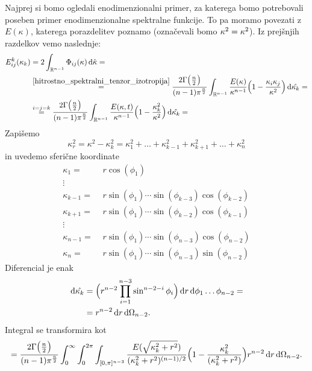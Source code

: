 \documentclass[mat2, tisk]{fmfdelo}
\newcommand{\R}{\mathbb R}
\newcommand{\bd}{\textbf}
\begin{document}
Najprej si bomo ogledali enodimenzionalni primer, za katerega bomo
potrebovali poseben primer enodimenzionalne spektralne funkcije. To pa moramo 
povezati z $E(\kappa)$, katerega porazdelitev poznamo (označevali bomo $\bd{\text{$\kappa$}}^2 = \kappa^2$). Iz prejšnjih razdelkov vemo 
naslednje: 
\begin{align*}
E_{ij}^k(\kappa_k) &= 2 \int_{\R^{n-1}}\Phi_{ij}(\bd{\text{$\kappa$}}) \dif \hat{\bd{\text{$\kappa$}}} = \\
&\stackrel{\ref{hitrostno_spektralni_tenzor_izotropija}}{=} \frac{2\Gamma\big(\frac{n}{2}\big)}{(n-1)\pi^\frac{n}{2}} \int_{\R^{n-1}} \frac{E(\kappa)}{\kappa^{n-1}}\Big(1 - \frac{\kappa_i \kappa_j}{\kappa^2}\Big)\dif \hat{\bd{\text{$\kappa_k$}}} = \\
&\stackrel{i=j=k}{=} \frac{2\Gamma\big(\frac{n}{2}\big)}{(n-1)\pi^\frac{n}{2}} \int_{\R^{n-1}} \frac{E(\kappa, t)}{\kappa^{n-1}}\Big(1 - \frac{\kappa_k^2}{\kappa^2}\Big)\dif \hat{\bd{\text{$\kappa_k$}}} = 
\end{align*}
Zapišemo 
$$
\kappa_r^2 = \kappa^2 - \kappa_k^2 = \kappa_1^2 + \dots + \kappa_{k-1}^2 + \kappa_{k+1}^2 + \dots + \kappa_n^2
$$
in uvedemo sferične koordinate 
\begin{align*}
\kappa_1 =& \,\,r\cos(\phi_1) \\
\vdots &\\
\kappa_{k-1} =& \,\,r\sin(\phi_{1}) \cdots \sin(\phi_{k-3}) \cos(\phi_{k-2})\\
\kappa_{k+1} =& \,\,r\sin(\phi_{1}) \cdots \sin(\phi_{k-2}) \cos(\phi_{k-1})\\
\vdots &\\
\kappa_{n-1} =& \,\,r\sin(\phi_{1}) \cdots \sin(\phi_{n-3}) \cos(\phi_{n-2})\\
\kappa_{n} =& \,\,r\sin(\phi_{1}) \cdots \sin(\phi_{n-3}) \sin(\phi_{n-2})
\end{align*}
Diferencial je enak 
\begin{align*}
\dif \hat{\bd{\text{$\kappa_k$}}} &= \Big(r^{n-2} \prod_{i=1}^{n-3} \sin^{n-2-i}{\phi_i}\Big) \dif r \dif \phi_1 \dots \phi_{n-2} = \\
&= r^{n-2} \dif r \dif \Omega_{n-2}.
\end{align*}
Integral se transformira kot
\begin{align*}
= \frac{2\Gamma\big(\frac{n}{2}\big)}{(n-1)\pi^\frac{n}{2}} \int_{0}^\infty \int_{0}^{2\pi} \int_{[0,\pi]^{n-3}}\frac{E(\sqrt{\kappa_k^2 + r^2})}{(\kappa_k^2 + r^2)^{(n-1)/2}}\Big(1 - \frac{\kappa_k^2}{(\kappa_k^2 + r^2)}\Big) r^{n-2} \dif r \dif \Omega_{n-2}.
\end{align*}
\end{document}
